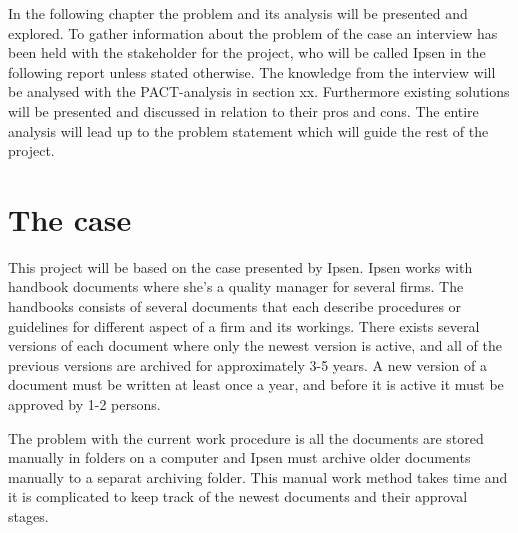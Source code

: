 In the following chapter the problem and its analysis will be presented and explored. 
To gather information about the problem of the case an interview has been held with the stakeholder for the project, who will be called Ipsen in the following report unless stated otherwise.
The knowledge from the interview will be analysed with the PACT-analysis in section xx.
Furthermore existing solutions will be presented and discussed in relation to their pros and cons.
The entire analysis will lead up to the problem statement which will guide the rest of the project.

\section{The case} \label{case}

This project will be based on the case presented by Ipsen.
Ipsen works with handbook documents where she's a quality manager for several firms.
The handbooks consists of several documents that each describe procedures or guidelines for different aspect of a firm and its workings.
There exists several versions of each document where only the newest version is active, and all of the previous versions are archived for approximately 3-5 years.
A new version of a document must be written at least once a year, and before it is active it must be approved by 1-2 persons.

The problem with the current work procedure is all the documents are stored manually in folders on a computer and Ipsen must archive older documents manually to a separat archiving folder. This manual work method takes time and it is complicated to keep track of the newest documents and their approval stages.
